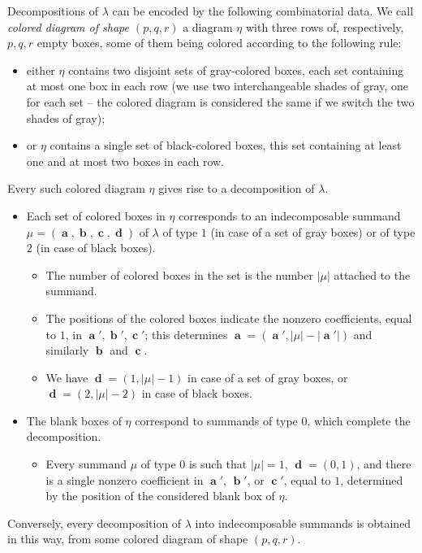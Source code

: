\documentclass[12pt,reqno]{amsart}
\begin{document}
Decompositions of $\lambda$ can be encoded by the following combinatorial data. We call {\em colored diagram of shape $(p,q,r)$}
a diagram $\eta$ with three rows of, respectively, $p,q,r$ empty boxes, some of them being colored according to the following rule:
\begin{itemize}
    \item either $\eta$ contains two disjoint sets of gray-colored boxes, each set containing at most one box in each row (we use two interchangeable shades of gray, one for each set -- the colored diagram is considered the same if we switch the two shades of gray);
    \item or $\eta$ contains a single set of black-colored boxes, this set containing at least one and at most two boxes in each row.
\end{itemize}
Every such colored diagram $\eta$ gives rise to a decomposition of $\lambda$.
\begin{itemize}
\item Each set of colored boxes in $\eta$ corresponds to an indecomposable summand $\mu=(\mbfa,\mbfb,\mbfc,\mbfd)$ of $\lambda$ of type $1$ (in case of a set of gray boxes) or of type $2$ (in case of black boxes).
\begin{itemize}
\item The number of colored boxes in the set is the number $|\mu|$ attached to the summand. %
\item The positions of the colored boxes indicate the  nonzero coefficients, equal to $1$, in $\mbfa',\mbfb',\mbfc'$; this determines $\mbfa=(\mbfa',|\mu|-|\mbfa'|)$ and similarly $\mbfb$ and $\mbfc$.
\item We have $\mbfd=(1,|\mu|-1)$ in case of a set of gray boxes, or $\mbfd=(2,|\mu|-2)$ in case of black boxes.
\end{itemize}
\item The blank boxes of $\eta$ correspond to summands of type $0$, which complete the decomposition.
\begin{itemize}
    \item Every summand $\mu$ of type $0$ is such that $|\mu|=1$, $\mbfd=(0,1)$, and there is a single nonzero coefficient in $\mbfa'$, $\mbfb'$, or $\mbfc'$, equal to $1$, determined by the position of the considered blank box of $\eta$.
\end{itemize}
\end{itemize}
Conversely, every decomposition of $\lambda$ into indecomposable summands is obtained in this way, from some colored diagram of shape $(p,q,r)$.
\end{document}
